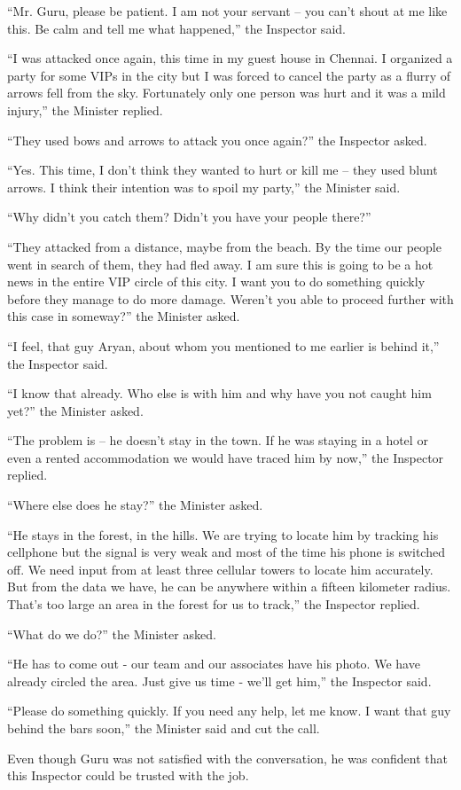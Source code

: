 “Mr. Guru, please be patient. I am not your servant – you can't shout at me like
this. Be calm and tell me what happened,” the Inspector said.

“I was attacked once again, this time in my guest house in Chennai. I organized
a party for some VIPs in the city but I was forced to cancel the party as a
flurry of arrows fell from the sky. Fortunately only one person was hurt and it
was a mild injury,” the Minister replied.

“They used bows and arrows to attack you once again?” the Inspector asked.

“Yes. This time, I don't think they wanted to hurt or kill me – they used blunt
arrows. I think their intention was to spoil my party,” the Minister said.

“Why didn't you catch them? Didn't you have your people there?”

“They attacked from a distance, maybe from the beach. By the time our people
went in search of them, they had fled away. I am sure this is going to be a hot
news in the entire VIP circle of this city. I want you to do something quickly
before they manage to do more damage. Weren't you able to proceed further with
this case in someway?” the Minister asked.

“I feel, that guy Aryan, about whom you mentioned to me earlier is behind it,”
the Inspector said.

“I know that already. Who else is with him and why have you not caught him yet?”
the Minister asked.

“The problem is – he doesn't stay in the town. If he was staying in a hotel or
even a rented accommodation we would have traced him by now,” the Inspector
replied.

“Where else does he stay?” the Minister asked.

“He stays in the forest, in the hills. We are trying to locate him by tracking
his cellphone but the signal is very weak and most of the time his phone is
switched off. We need input from at least three cellular towers to locate him
accurately. But from the data we have, he can be anywhere within a fifteen
kilometer radius. That's too large an area in the forest for us to track,” the
Inspector replied.

“What do we do?” the Minister asked.

“He has to come out - our team and our associates have his photo. We have
already circled the area. Just give us time - we'll get him,” the Inspector
said.

“Please do something quickly. If you need any help, let me know. I want that guy
behind the bars soon,” the Minister said and cut the call.

Even though Guru was not satisfied with the conversation, he was confident that
this Inspector could be trusted with the job.